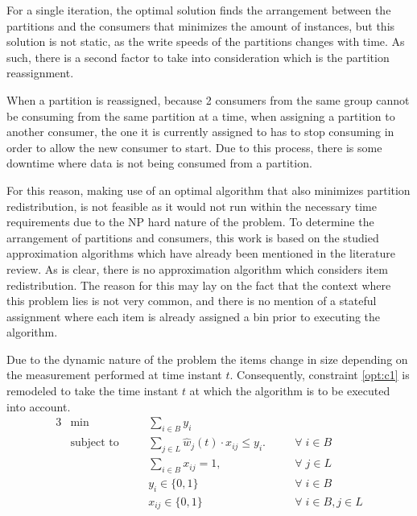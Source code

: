 For a single iteration, the optimal solution finds the arrangement between the
partitions and the consumers that minimizes the amount of instances, but this
solution is not static, as the write speeds of the partitions changes with time.
As such, there is a second factor to take into consideration which is the
partition reassignment. 

When a partition is reassigned, because 2 consumers from the same group cannot
be consuming from the same partition at a time, when assigning a partition to
another consumer, the one it is currently assigned to has to stop consuming in
order to allow the new consumer to start. Due to this process, there is some
downtime where data is not being consumed from a partition.

For this reason, making use of an optimal algorithm that also minimizes
partition redistribution, is not feasible as it would not run within the
necessary time requirements due to the NP hard nature of the problem.  To
determine the arrangement of partitions and consumers, this work is based on the
studied approximation algorithms which have already been mentioned in the
literature review. As is clear, there is no approximation algorithm which
considers item redistribution. The reason for this may lay on the fact that the
context where this problem lies is not very common, and there is no mention of a
stateful assignment where each item is already assigned a bin prior to executing
the algorithm.

Due to the dynamic nature of the problem the items change in size depending on
the measurement performed at time instant $t$. Consequently, constraint
\ref{opt:c1} is remodeled to take the time instant $t$ at which the algorithm is
to be executed into account.
\begin{alignat}{3}
\label{BPP model}
    &\min       
        &&\sum_{i \in B} y_i 
            && \\
    &\text{subject to} \quad
        && \sum_{j \in L} \hat w_j(t) \cdot x_{ij} \leq y_i. \quad      
            && \forall \; i \in B \\
    &   && \sum_{i \in B} x_{ij} = 1, \quad                             
            && \forall \; j \in L \\
    &   && y_i \in \{0, 1\}                                             
            && \forall \; i \in B \\
    &   && x_{ij} \in \{0,1\}                                           
            && \forall \; i \in B, j \in L
\end{alignat}

